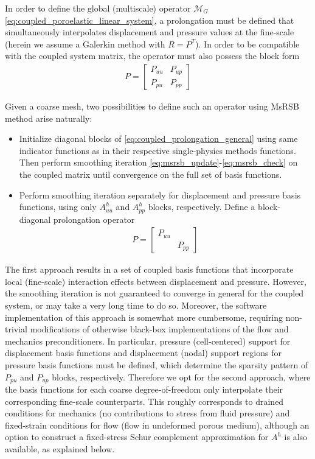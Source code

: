 In order to define the global (multiscale) operator $\mathcal{M}_G$ \eqref{eq:coupled_poroelastic_linear_system}, a prolongation must be defined that simultaneously interpolates displacement and pressure values at the fine-scale (herein we assume a Galerkin method with $R = P^T$).   In order to be compatible with the coupled system matrix, the operator must also possess the block form
\begin{align}
    P = 
    \begin{bmatrix}
        P_{uu} & P_{up} \\
        P_{pu} & P_{pp}
    \end{bmatrix}
    \label{eq:coupled_prolongation_general}
\end{align}

Given a coarse mesh, two possibilities to define such an operator using MsRSB method arise naturally:
\begin{itemize}
    \item Initialize diagonal blocks of \eqref{eq:coupled_prolongation_general} using same indicator functions as in their respective single-physics methods functions.   Then perform smoothing iteration \eqref{eq:msrsb_update}-\eqref{eq:msrsb_check} on the coupled matrix until convergence on the full set of basis functions.
    \item Perform smoothing iteration separately for displacement and pressure basis functions, using only $A_{uu}^h$ and $A_{pp}^h$ blocks, respectively.   Define a block-diagonal prolongation operator
    \begin{align}
        P = 
    \begin{bmatrix}
    P_{uu} &        \\
           & P_{pp}
    \end{bmatrix}
    \label{eq:coupled_prolongation}
    \end{align}
\end{itemize}

The first approach results in a set of coupled basis functions that incorporate local (fine-scale) interaction effects between displacement and pressure.   However, the smoothing iteration is not guaranteed to converge in general for the coupled system, or may take a very long time to do so.   Moreover, the software implementation of this approach is somewhat more cumbersome, requiring non-trivial modifications of otherwise black-box implementations of the flow and mechanics preconditioners.   In particular, pressure (cell-centered) support for displacement basis functions and displacement (nodal) support regions for pressure basis functions must be defined, which determine the sparsity pattern of $P_{pu}$ and $P_{up}$ blocks, respectively.   Therefore we opt for the second approach, where the basis functions for each coarse degree-of-freedom only interpolate their corresponding fine-scale counterparts.   This roughly corresponds to drained conditions for mechanics (no contributions to stress from fluid pressure) and fixed-strain conditions for flow (flow in undeformed porous medium), although an option to construct a fixed-stress Schur complement approximation for $A^h$ is also available, as explained below.

